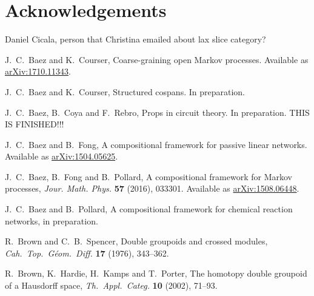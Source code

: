 \documentclass{amsart}
\begin{document}
\section{Acknowledgements}
Daniel Cicala, person that Christina emailed about lax slice category?
\begin{thebibliography}{100}

 J.\ C.\ Baez and K.\ Courser, Coarse-graining open Markov processes. Available as \href{https://arxiv.org/abs/1710.11343}{arXiv:1710.11343}.

 J.\ C.\ Baez and K.\ Courser, Structured cospans. In preparation.

 J.\ C.\ Baez, B.\ Coya and F.\ Rebro, Props in circuit theory. In preparation. THIS IS FINISHED!!!

 J.\ C.\ Baez and B.\ Fong, A compositional framework for passive linear networks. Available as \href{http://arxiv.org/abs/1504.05625}{arXiv:1504.05625}.

 J.\ C.\ Baez, B.\ Fong and B.\ Pollard, A compositional framework for Markov processes, \textsl{Jour. Math. Phys.} \textbf{57} (2016), 033301. Available as \href{http://arxiv.org/abs/1508.06448}{arXiv:1508.06448}.

 J.\ C.\ Baez and B.\ Pollard, A compositional framework for chemical reaction networks, in preparation.

 R.\ Brown and C.\ B.\ Spencer, Double groupoids and crossed modules, 
\textsl{Cah.\ Top.\ G\'eom.\ Diff.} \textbf{17} (1976), 343--362.

 R.\ Brown, K.\ Hardie, H.\ Kamps and T.\ Porter, The homotopy double groupoid of a Hausdorff space, \textsl{Th.\ Appl.\ Categ.} \textbf{10} (2002), 71--93.






\end{thebibliography}
\end{document}
